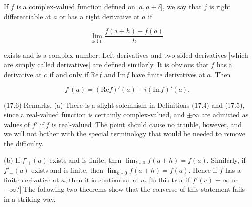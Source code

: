If $f$ is a complex-valued function defined on $[a, a + \delta[$, we say that $f$ is right differentiable at $a$ or has a right derivative at $a$ if

$$\lim_{k \downarrow 0} \frac{f(a + h) - f(a)}{h}$$

exists and is a complex number. Left derivatives and two-sided derivatives [which are simply called derivatives] are defined similarly. It is obvious that $f$ has a derivative at $a$ if and only if $\text{Re}f$ and $\text{Im}f$ have finite derivatives at $a$. Then

$$f'(a) = (\text{Re}f)'(a) + i(\text{Im}f)'(a).$$

(17.6) Remarks. (a) There is a slight solemnism in Definitions (17.4) and (17.5), since a real-valued function is certainly complex-valued, and $\pm \infty$ are admitted as values of $f'$ if $f$ is real-valued. The point should cause no trouble, however, and we will not bother with the special terminology that would be needed to remove the difficulty.

(b) If $f'_+(a)$ exists and is finite, then $\lim_{k \downarrow 0} f(a + h) = f(a)$. Similarly, if $f'_-(a)$ exists and is finite, then $\lim_{k \downarrow 0} f(a + h) = f(a)$. Hence if $f$ has a finite derivative at $a$, then it is continuous at $a$. [Is this true if $f'(a) = \infty$ or $-\infty$?] The following two theorems show that the converse of this statement fails in a striking way.